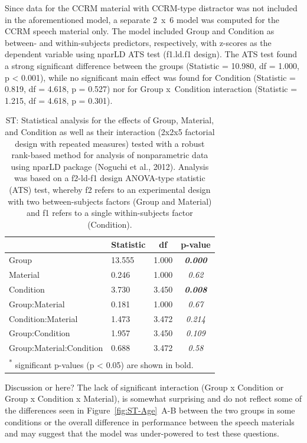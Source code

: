 \documentclass[a4paper, twoside]{templates/ociamthesis}
\begin{document}
Since data for the CCRM material with CCRM-type distractor was not included in the aforementioned model, a separate 2~x~6 model was computed for the CCRM speech material only. The model included Group and Condition as between- and within-subjects predictors, respectively, with z-scores as the dependent variable using nparLD ATS test (f1.ld.f1 design). The ATS test found a strong significant difference between the groups (Statistic = 10.980, df = 1.000, p \textless{} 0.001), while no significant main effect was found for Condition (Statistic = 0.819, df = 4.618, p = 0.527) nor for Group x~Condition interaction (Statistic = 1.215, df = 4.618, p = 0.301).

\begin{table}

\caption{\label{tab:ST-Tab-nparLD}ST: Statistical analysis for the effects of Group, Material, and Condition as well as their interaction (2x2x5 factorial design with repeated measures) tested with a robust rank-based method for analysis of nonparametric data using nparLD package (Noguchi et al., 2012). Analysis was based on a f2-ld-f1 design ANOVA-type statistic (ATS) test, whereby f2 refers to an experimental design with two between-subjects factors (Group and Material) and f1 refers to a single within-subjects factor (Condition).}
\centering
\begin{tabular}[t]{llc>{}c}
\toprule
  & Statistic & df & p-value\\
\midrule
Group & 13.555 & 1.000 & \em{\textbf{0.000}}\\
Material & 0.246 & 1.000 & \em{0.62}\\
Condition & 3.730 & 3.450 & \em{\textbf{0.008}}\\
Group:Material & 0.181 & 1.000 & \em{0.67}\\
Condition:Material & 1.473 & 3.472 & \em{0.214}\\
Group:Condition & 1.957 & 3.450 & \em{0.109}\\
Group:Material:Condition & 0.688 & 3.472 & \em{0.58}\\
\bottomrule
\multicolumn{4}{l}{\textsuperscript{*} significant p-values (p < 0.05) are shown in bold.}\\
\end{tabular}
\end{table}

\colorbox[HTML]{CCCCFF}{Discussion or here?} The lack of significant interaction (Group x Condition or Group x Condition x Material), is somewhat surprising and do not reflect some of the differences seen in Figure~\ref{fig:ST-Age}~A-B between the two groups in some conditions or the overall difference in performance between the speech materials and may suggest that the model was under-powered to test these questions.
\end{document}
